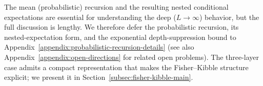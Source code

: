 The mean (probabilistic) recursion and the resulting nested conditional expectations are essential for understanding the deep (\(L\to\infty\)) behavior, but the full discussion is lengthy. We therefore defer the probabilistic recursion, its nested-expectation form, and the exponential depth-suppression bound to Appendix~\ref{appendix:probabilistic-recursion-details} (see also Appendix~\ref{appendix:open-directions} for related open problems).
The three-layer case admits a compact representation that makes the Fisher--Kibble structure explicit; we present it in Section~\ref{subsec:fisher-kibble-main}.
